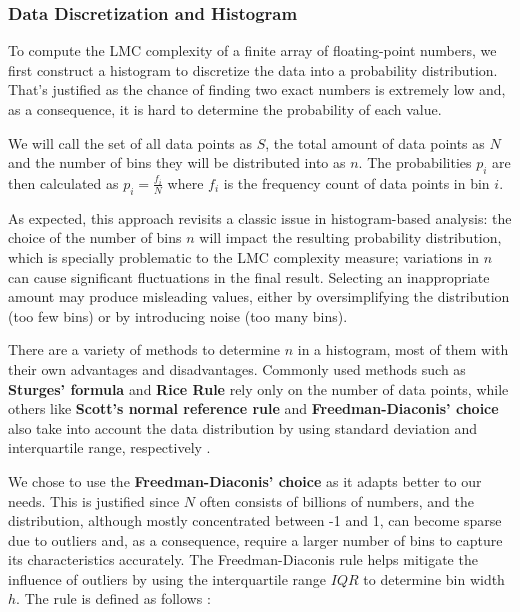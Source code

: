     \subsubsection{Data Discretization and Histogram}
    \label{sec:data_discretization}

        To compute the LMC complexity of a finite array of floating-point numbers, we first construct a histogram to discretize the data into a probability distribution. That's justified as the chance of finding two exact numbers is extremely low and, as a consequence, it is hard to determine the probability of each value. 
        
        We will call the set of all data points as \( S \), the total amount of data points as \( N \) and the number of bins they will be distributed into as \( n \). The probabilities \( p_i \) are then calculated as \( p_i = \frac{f_i}{N} \) where \( f_i \) is the frequency count of data points in bin \( i \).

        As expected, this approach revisits a classic issue in histogram-based analysis: the choice of the number of bins \( n \) will impact the resulting probability distribution, which is specially problematic to the LMC complexity measure; variations in \( n \) can cause significant fluctuations in the final result. Selecting an inappropriate amount may produce misleading values, either by oversimplifying the distribution (too few bins) or by introducing noise (too many bins). 

        There are a variety of methods to determine \( n \) in a histogram, most of them with their own advantages and disadvantages. Commonly used methods such as \textbf{Sturges' formula} \cite{Sturges1926} and \textbf{Rice Rule} \cite{RiceRule} rely only on the number of data points, while others like \textbf{Scott's normal reference rule} and \textbf{Freedman-Diaconis' choice} also take into account the data distribution by using standard deviation and interquartile range, respectively \cite{Knuth2006}.   

        We chose to use the \textbf{Freedman-Diaconis' choice} as it adapts better to our needs. This is justified since \( N \) often consists of billions of numbers, and the distribution, although mostly concentrated between -1 and 1, can become sparse due to outliers and, as a consequence, require a larger number of bins to capture its characteristics accurately. The Freedman-Diaconis rule helps mitigate the influence of outliers by using the interquartile range \( IQR \) to determine bin width \( h \). The rule is defined as follows \cite{FreedmanDiaconis1981}:

